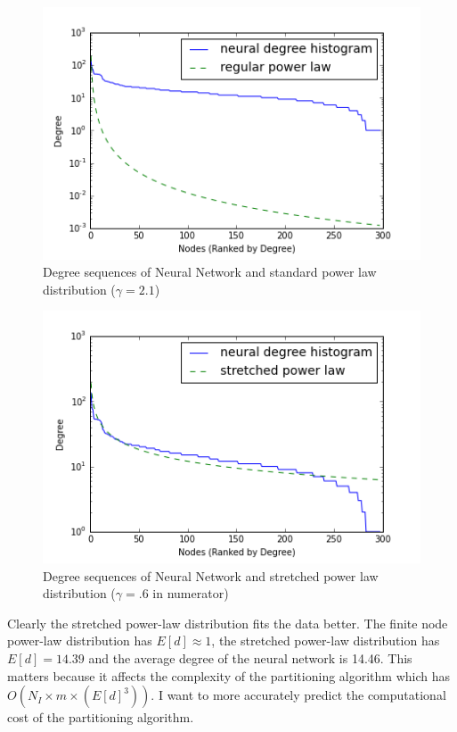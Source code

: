 \documentclass{article}
\begin{document}
\begin{figure}[H]
\centering
\includegraphics[width = \linewidth]{neuralsequenceplot2.png}
\caption{Degree sequences of Neural Network and standard power law distribution ($\gamma = 2.1$)}
\end{figure}

\begin{figure}[H]
\centering
\includegraphics[width = \linewidth]{neuralsequenceplot.png}
\caption{Degree sequences of Neural Network and stretched power law distribution ($\gamma = .6$ in numerator)}
\end{figure}

Clearly the stretched power-law distribution fits the data better. The finite node power-law distribution has $E[d] \approx 1$, the stretched power-law distribution has $E[d] = 14.39$ and the average degree of the neural network is 14.46. This matters because it affects the complexity of the partitioning algorithm which has $O(N_I\times m\times (E[d]^3))$. I want to more accurately predict the computational cost of the partitioning algorithm.
\end{document}
